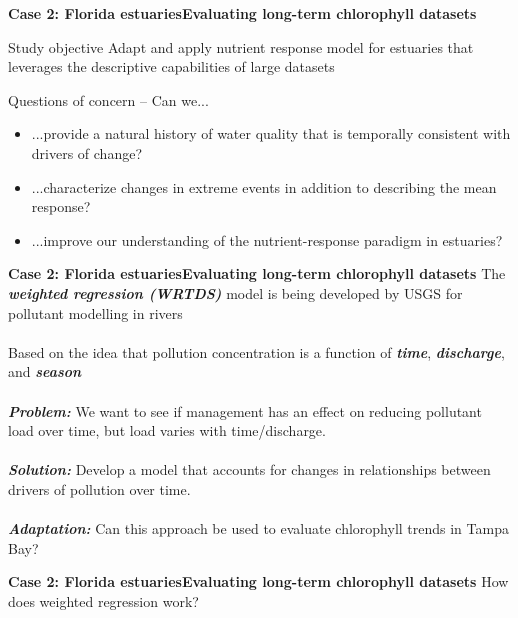 \documentclass[serif]{beamer}\usepackage[]{graphicx}\usepackage[]{color}
\newcommand{\emtxt}[1]{\textbf{\textit{#1}}}
\begin{document}
\begin{frame}{\textbf{Case 2: Florida estuaries}}{\textbf{Evaluating long-term chlorophyll datasets}}
\onslide<+->
\begin{block}{Study objective}
Adapt and apply nutrient response model for estuaries that leverages the descriptive capabilities of large datasets \scriptsize \cite{Beck15}
\end{block}
\vspace{0.2in}
\onslide<+->
Questions of concern -- Can we...
\begin{itemize}
\item ...provide a natural history of water quality that is temporally consistent with drivers of change?
\onslide<+->
\item ...characterize changes in extreme events in addition to describing the mean response?  
\onslide<+->
\item ...improve our understanding of the nutrient-response paradigm in estuaries?
\end{itemize}
\end{frame}

\begin{frame}{\textbf{Case 2: Florida estuaries}}{\textbf{Evaluating long-term chlorophyll datasets}}
\onslide<+->
The \emtxt{weighted regression (WRTDS)} model is being developed by USGS for pollutant modelling in rivers \cite{Hirsch10}\\~\\
Based on the idea that pollution concentration is a function of \emtxt{time}, \emtxt{discharge}, and \emtxt{season}\\~\\
\onslide<+->
\emtxt{Problem:} We want to see if management has an effect on reducing pollutant load over time, but load varies with time/discharge.\\~\\
\onslide<+->
\emtxt{Solution:} Develop a model that accounts for changes in relationships between drivers of pollution over time.\\~\\
\onslide<+->
\emtxt{Adaptation:} Can this approach be used to evaluate chlorophyll trends in Tampa Bay?
\end{frame}



\begin{frame}{\textbf{Case 2: Florida estuaries}}{\textbf{Evaluating long-term chlorophyll datasets}}
How does weighted regression work?
\begin{center}
\end{center}
\end{frame}
\end{document}
